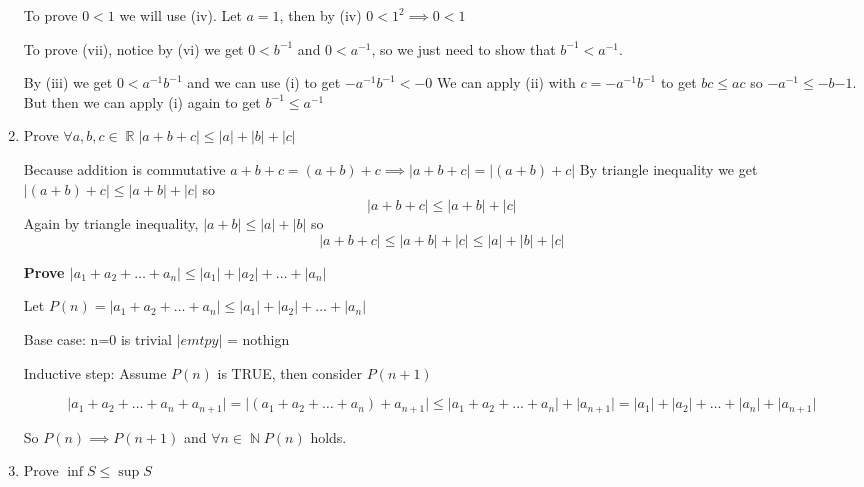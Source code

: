\documentclass[10pt,a4paper]{article}
\DeclareMathOperator*{\R}{\mathbb{R}}
\DeclareMathOperator*{\N}{\mathbb{N}}
\begin{document}
\begin{enumerate}
        To prove $0<1$ we will use (iv). Let $a = 1$, then by (iv) $0 < 1^2 \implies 0 < 1$

        To prove (vii), notice by (vi) we get $ 0 < b^{-1} $ and $0 < a^{-1}$, so we just need to show that $b^{-1} < a^{-1}$. 

        By (iii) we get $ 0 < a^{-1} b^{-1}$ and we can use (i) to get $ -a^{-1}b^{-1} < -0$
        We can apply (ii) with $ c = -a^{-1}b^{-1}$ to get $bc \leq ac $ so 
        $ - a^{-1} \leq -b{-1}$. But then we can apply (i) again to get $b^{-1} \leq a^{-1}$ 

    \item Prove $\forall a, b, c \in \R \lvert a+b+c\rvert \leq \lvert a \rvert+\lvert b \rvert+\lvert c \rvert $

        Because addition is commutative $a+b+c = (a+b)+c \implies \lvert a+b+c\rvert = \lvert (a+b)+c\rvert$
        By triangle inequality we get $\lvert(a+b)+c\rvert \leq \lvert a+b\rvert + \lvert c \rvert$ so 
        $$
            \lvert a+b+c\rvert \leq \lvert a+b\rvert + \lvert c \rvert
        $$
        Again by triangle inequality,  $\lvert a+b\rvert \leq \lvert a\rvert + \lvert b \rvert$ so 
        $$
            \lvert a+b+c\rvert \leq \lvert a+b\rvert + \lvert c \rvert \leq \lvert a\rvert + \lvert b\rvert + \lvert c\rvert
        $$

        \textbf{Prove $\lvert a_1 + a_2 + \ldots + a_n \rvert \leq \lvert a_1 \rvert +\lvert a_2 \rvert +\ldots + \lvert a_n \rvert $}

        Let $P(n) = \lvert a_1 + a_2 + \ldots + a_n \rvert \leq \lvert a_1 \rvert +\lvert a_2 \rvert +\ldots + \lvert a_n \rvert$

        Base case: n=0 is trivial $\lvert emtpy \rvert$ = nothign 

        Inductive step: Assume $P(n)$ is TRUE, then consider $P(n+1)$

        $$
            \lvert a_1 + a_2 + \ldots +a_n + a_{n+1} \rvert  = 
            \lvert (a_1 + a_2 + \ldots +a_n) + a_{n+1} \rvert \leq
            \lvert a_1+ a_2+\ldots +a_n \rvert + \lvert a_{n+1}\rvert = 
            \lvert a_1 \rvert +\lvert a_2 \rvert +\ldots + \lvert a_n \rvert + \lvert a_{n+1}\rvert
        $$

        So $P(n) \implies P(n+1)$ and $\forall n \in \N P(n)$ holds.
 


    \item  Prove $ \inf S \leq \sup S $


\end{enumerate}
\end{document}
